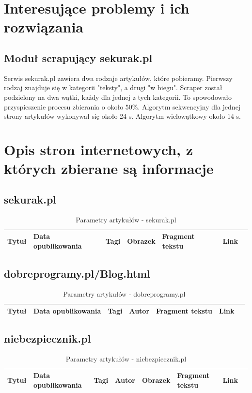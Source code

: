 \documentclass[12pt, titlepage]{article}
\begin{document}
	\section{Interesujące problemy i ich rozwiązania}
		\subsection{Moduł scrapujący sekurak.pl}
			Serwis sekurak.pl zawiera dwa rodzaje artykułów, które pobieramy. Pierwszy rodzaj znajduje się w kategorii "teksty", a drugi "w biegu". Scraper został podzielony na dwa wątki, każdy dla jednej z tych kategorii. To spowodowało przyspieszenie procesu zbierania o około 50\%. Algorytm sekwencyjny dla jednej strony artykułów wykonywał się około 24 s. Algorytm wielowątkowy około 14 s.
	
	
	\section{Opis stron internetowych, z których zbierane są informacje}
		\subsection{sekurak.pl}
		\begin{table}[H]
			\centering
			\caption{Parametry artykułów - sekurak.pl}
			\label{sekurak_parametry}
			\begin{tabular}{ | C{2cm} | C{4cm} | C{2cm} | C{2cm} | C{3cm} | C{2cm} | @{}m{0pt}@{}}
				\hline
				Tytuł & Data opublikowania & Tagi & Obrazek & Fragment tekstu & Link &\\[0.5cm]
				\hline
			\end{tabular}
		\end{table}

		\subsection{dobreprogramy.pl/Blog.html} 
		\begin{table}[H]
			\centering
			\caption{Parametry artykułów - dobreprogramy.pl}
			\label{dobreprogramy_parametry}
			\begin{tabular}{ | C{2cm} | C{4cm} | C{2cm} | C{2cm} | C{3cm} | C{2cm} | @{}m{0pt}@{}}
				\hline
				Tytuł & Data opublikowania & Tagi & Autor & Fragment tekstu & Link &\\[0.5cm]
				\hline
			\end{tabular}
		\end{table}
		\subsection{niebezpiecznik.pl} 
		\begin{table}[H]
			\centering
			\caption{Parametry artykułów - niebezpiecznik.pl}
			\label{niebezpiecznik_parametry}
			\begin{tabular}{ | C{1.5cm} | C{4cm} | C{1.5cm} | C{1.5cm} | C{1.5cm} | C{3cm} | C{1.5cm} | @{}m{0pt}@{}}
				\hline
				Tytuł & Data opublikowania & Tagi & Autor & Obrazek & Fragment tekstu & Link &\\[0.5cm]
				\hline
			\end{tabular}
		\end{table}
\end{document}
